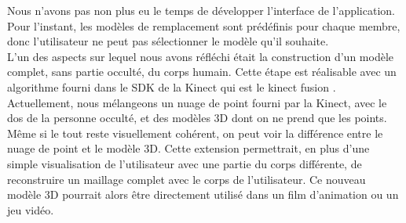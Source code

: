 Nous n'avons pas non plus eu le temps de développer l'interface de l'application. Pour l'instant, les modèles de remplacement
sont prédéfinis pour chaque membre, donc l'utilisateur ne peut pas sélectionner le modèle qu'il souhaite.\\

L'un des aspects sur lequel nous avons réfléchi était la construction d'un modèle complet, sans partie occulté, du corps
humain. Cette étape est réalisable avec un algorithme fourni dans le SDK de la Kinect qui est le \og kinect fusion \fg\cite{
KinectFusion}. Actuellement, nous mélangeons un nuage de point fourni par la Kinect, avec le dos de la personne occulté, et 
des modèles 3D dont on ne prend que les points. Même si le tout reste visuellement cohérent, on peut voir la différence entre
le nuage de point et le modèle 3D.
Cette extension permettrait, en plus d'une simple visualisation de l'utilisateur avec une partie du corps
différente, de reconstruire un maillage complet avec le corps de l'utilisateur. Ce nouveau modèle 3D pourrait alors être
directement utilisé dans un film d'animation ou un jeu vidéo.
